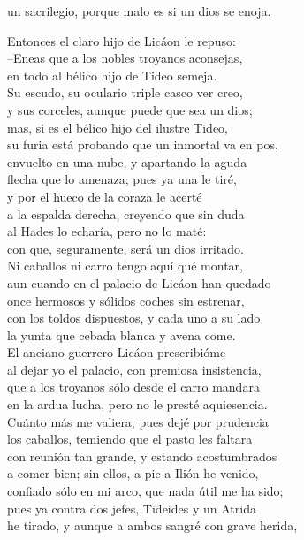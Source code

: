 \documentclass[11pt,twoside]{article}
\begin{document}
un sacrilegio, porque malo es si un dios se enoja.\par
Entonces el claro hijo de Licáon le repuso:\\
--Eneas que a los nobles troyanos aconsejas,\\
en todo al bélico hijo de Tideo semeja.\\
Su escudo, su oculario triple casco ver creo,\\
y sus corceles, aunque puede que sea un dios;\\
mas, si es el bélico hijo del ilustre Tideo,\\
su furia está probando que un inmortal va en pos,\\
envuelto en una nube, y apartando la aguda\\
flecha que lo amenaza; pues ya una le tiré,\\
y por el hueco de la coraza le acerté\\
a la espalda derecha, creyendo que sin duda\\
al Hades lo echaría, pero no lo maté:\\
con que, seguramente, será un dios irritado.\\
Ni caballos ni carro tengo aquí qué montar,\\
aun cuando en el palacio de Licáon han quedado\\
once hermosos y sólidos coches sin estrenar,\\
con los toldos dispuestos, y cada uno a su lado\\
la yunta que cebada blanca y avena come.\\
El anciano guerrero Licáon prescribióme\\
al dejar yo el palacio, con premiosa insistencia,\\
que a los troyanos sólo desde el carro mandara\\
en la ardua lucha, pero no le presté aquiesencia.\\
Cuánto más me valiera, pues dejé por prudencia\\
los caballos, temiendo que el pasto les faltara\\
con reunión tan grande, y estando acostumbrados\\
a comer bien; sin ellos, a pie a Ilión he venido,\\
confiado sólo en mi arco, que nada útil me ha sido;\\
pues ya contra dos jefes, Tideides y un Atrida\\
he tirado, y aunque a ambos sangré con grave herida,\\
\end{document}
